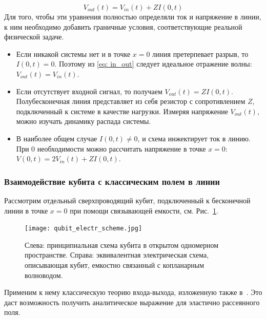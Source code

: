\begin{equation}
V_{out}(t) = V_{in}(t) + ZI(0,t)
\label{eq: in_out}
\end{equation}
 Для того, чтобы эти уравнения полностью определяли ток и напряжение в линии, к ним необходимо добавить граничные условия, соответствующие реальной физической задаче.
\begin{itemize}
	\item  Если никакой системы нет и в точке $x=0$ линия претерпевает разрыв, то $I(0,t)=0$. Поэтому из \eqref{eq: in_out} следует идеальное отражение волны: $V_{out}(t) = V_{in}(t)$.
	\item Если отсутствует входной сигнал, то получаем $V_{out}(t) = ZI(0,t)$. Полубесконечная линия представляет из себя резистор с сопротивлением $Z$, подключенный к системе в качестве нагрузки. Измеряя напряжение $V_{out}(t)$, можно изучать динамику распада системы.
	\item В наиболее общем случае $I(0,t)\ne 0$, и схема инжектирует ток в линию. При 
	0
	необходимости можно рассчитать напряжение в точке $x=0$: $V(0,t) = 2V_{in}(t) + ZI(0,t)$.  	
\end{itemize}
\subsubsection{Взаимодействие кубита с классическим полем в линии}
Рассмотрим отдельный сверхпроводящий кубит, подключенный к бесконечной линии в точке $x=0$ при помощи связывающей емкости, см. Рис.~\ref{fig: el_scheme}.
\begin{figure}[h]
	\centering
	\texttt{[image: qubit\_electr\_scheme.jpg]}
	\caption[Эквивалентная электрическая схема подключения кубита к волноводной линии]{Слева: принципиальная схема кубита в открытом одномерном пространстве. Справа: эквивалентная электрическая схема, описывающая кубит, емкостно связанный с копланарным волноводом.}
	\label{fig: el_scheme}
\end{figure}
Применим к нему классическую теорию входа-выхода, изложенную также в~\cite{zagoskin2011quantum}. Это даст возможность получить аналитическое выражение для эластично рассеянного поля. 

